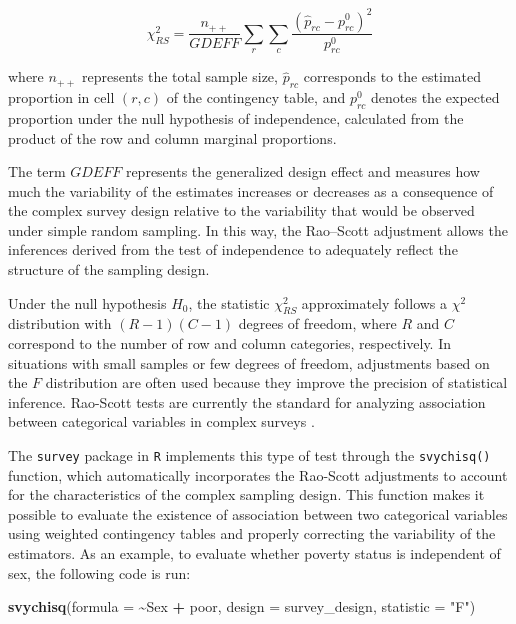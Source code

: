 \documentclass[
  english,
  12pt,
]{book}
\newenvironment{Shaded}{\begin{snugshade}}{\end{snugshade}}
\newcommand{\AttributeTok}[1]{\textcolor[rgb]{0.13,0.29,0.53}{#1}}
\newcommand{\FunctionTok}[1]{\textcolor[rgb]{0.13,0.29,0.53}{\textbf{#1}}}
\newcommand{\NormalTok}[1]{#1}
\newcommand{\SpecialCharTok}[1]{\textcolor[rgb]{0.81,0.36,0.00}{\textbf{#1}}}
\newcommand{\StringTok}[1]{\textcolor[rgb]{0.31,0.60,0.02}{#1}}
\begin{document}
\[
\chi_{RS}^2 = \frac{n_{++}}{GDEFF} \sum_r \sum_c \frac{(\hat{p}_{rc} - p_{rc}^0)^2}{p_{rc}^0}
\]

where \(n_{++}\) represents the total sample size, \(\hat{p}_{rc}\) corresponds to the estimated proportion in cell \((r,c)\) of the contingency table, and \(p_{rc}^0\) denotes the expected proportion under the null hypothesis of independence, calculated from the product of the row and column marginal proportions.

The term \(GDEFF\) \citep{heeringa2017applied} represents the generalized design effect and measures how much the variability of the estimates increases or decreases as a consequence of the complex survey design relative to the variability that would be observed under simple random sampling. In this way, the Rao--Scott adjustment allows the inferences derived from the test of independence to adequately reflect the structure of the sampling design.

Under the null hypothesis \(H_0\), the statistic \(\chi_{RS}^2\) approximately follows a \(\chi^2\) distribution with \((R-1)(C-1)\) degrees of freedom, where \(R\) and \(C\) correspond to the number of row and column categories, respectively. In situations with small samples or few degrees of freedom, adjustments based on the \(F\) distribution are often used because they improve the precision of statistical inference. Rao-Scott tests are currently the standard for analyzing association between categorical variables in complex surveys \citep{heeringa2017applied}.

The \texttt{survey} package in \texttt{R} implements this type of test through the \texttt{svychisq()} function, which automatically incorporates the Rao-Scott adjustments to account for the characteristics of the complex sampling design. This function makes it possible to evaluate the existence of association between two categorical variables using weighted contingency tables and properly correcting the variability of the estimators. As an example, to evaluate whether poverty status is independent of sex, the following code is run:

\begin{Shaded}
\begin{Highlighting}[]
\FunctionTok{svychisq}\NormalTok{(}\AttributeTok{formula =} \SpecialCharTok{\textasciitilde{}}\NormalTok{Sex }\SpecialCharTok{+}\NormalTok{ poor, }\AttributeTok{design =}\NormalTok{ survey\_design, }\AttributeTok{statistic =} \StringTok{"F"}\NormalTok{)}
\end{Highlighting}
\end{Shaded}
\end{document}
